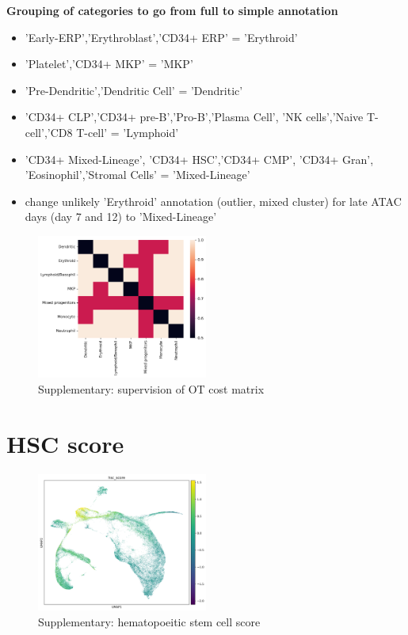 \documentclass[a4paper]{article}
\begin{document}
\textbf{Grouping of categories to go from full to simple annotation}
\begin{itemize}
  \item 'Early-ERP','Erythroblast','CD34+ ERP' = 'Erythroid'
  \item 'Platelet','CD34+ MKP' = 'MKP'
  \item 'Pre-Dendritic','Dendritic Cell' = 'Dendritic'
  \item 'CD34+ CLP','CD34+ pre-B','Pro-B','Plasma Cell', 'NK cells','Naive T-cell','CD8 T-cell' = 'Lymphoid'
  \item 'CD34+ Mixed-Lineage', 'CD34+ HSC','CD34+ CMP', 'CD34+ Gran', 'Eosinophil','Stromal Cells' = 'Mixed-Lineage'
  \item change unlikely 'Erythroid' annotation (outlier, mixed cluster) for late ATAC days (day 7 and 12) to 'Mixed-Lineage'
\end{itemize}

\begin{figure}[!htb]
  \centering
  \includegraphics[width=0.5\textwidth]{../figures/hematopoiesis/integration_supervision.png}
  \caption{Supplementary: supervision of OT cost matrix}
\end{figure}


\FloatBarrier
\section{HSC score}

\begin{figure}[!htb]
  \centering
  \includegraphics[width=0.5\textwidth]{../figures/hematopoiesis/integrated_hsc_score.png}
  \caption{Supplementary: hematopoeitic stem cell score}
\end{figure}
\end{document}
